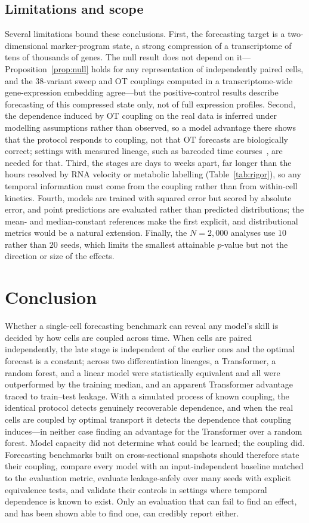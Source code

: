 \documentclass[10pt,letterpaper]{article}
\begin{document}
\subsection*{Limitations and scope}
Several limitations bound these conclusions. First, the forecasting target is a two-dimensional marker-program state, a strong compression of a transcriptome of tens of thousands of genes. The null result does not depend on it---Proposition~\ref{prop:null} holds for any representation of independently paired cells, and the $38$-variant sweep and OT couplings computed in a transcriptome-wide gene-expression embedding agree---but the positive-control results describe forecasting of this compressed state only, not of full expression profiles. Second, the dependence induced by OT coupling on the real data is inferred under modelling assumptions rather than observed, so a model advantage there shows that the protocol responds to coupling, not that OT forecasts are biologically correct; settings with measured lineage, such as barcoded time courses~\cite{weinreb2020lineage}, are needed for that. Third, the stages are days to weeks apart, far longer than the hours resolved by RNA velocity or metabolic labelling (Table~\ref{tab:rigor}), so any temporal information must come from the coupling rather than from within-cell kinetics. Fourth, models are trained with squared error but scored by absolute error, and point predictions are evaluated rather than predicted distributions; the mean- and median-constant references make the first explicit, and distributional metrics would be a natural extension. Finally, the $N=2{,}000$ analyses use $10$ rather than $20$ seeds, which limits the smallest attainable $p$-value but not the direction or size of the effects.

\section*{Conclusion}
\label{sec:conclusion}
Whether a single-cell forecasting benchmark can reveal any model's skill is decided by how cells are coupled across time. When cells are paired independently, the late stage is independent of the earlier ones and the optimal forecast is a constant; across two differentiation lineages, a Transformer, a random forest, and a linear model were statistically equivalent and all were outperformed by the training median, and an apparent Transformer advantage traced to train--test leakage. With a simulated process of known coupling, the identical protocol detects genuinely recoverable dependence, and when the real cells are coupled by optimal transport it detects the dependence that coupling induces---in neither case finding an advantage for the Transformer over a random forest. Model capacity did not determine what could be learned; the coupling did. Forecasting benchmarks built on cross-sectional snapshots should therefore state their coupling, compare every model with an input-independent baseline matched to the evaluation metric, evaluate leakage-safely over many seeds with explicit equivalence tests, and validate their controls in settings where temporal dependence is known to exist. Only an evaluation that can fail to find an effect, and has been shown able to find one, can credibly report either.
\end{document}
